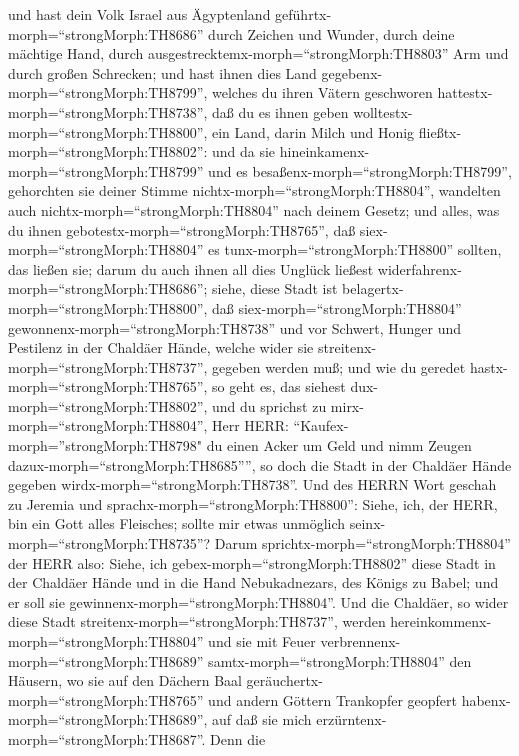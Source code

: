  und hast dein Volk Israel aus Ägyptenland
geführtx-morph=``strongMorph:TH8686'' durch Zeichen und Wunder, durch
deine mächtige Hand, durch ausgestrecktemx-morph=``strongMorph:TH8803''
Arm und durch großen Schrecken;  und hast ihnen dies Land
gegebenx-morph=``strongMorph:TH8799'', welches du ihren Vätern
geschworen hattestx-morph=``strongMorph:TH8738'', daß du es ihnen geben
wolltestx-morph=``strongMorph:TH8800'', ein Land, darin Milch und Honig
fließtx-morph=``strongMorph:TH8802'':  und da sie
hineinkamenx-morph=``strongMorph:TH8799'' und es
besaßenx-morph=``strongMorph:TH8799'', gehorchten sie deiner Stimme
nichtx-morph=``strongMorph:TH8804'', wandelten auch
nichtx-morph=``strongMorph:TH8804'' nach deinem Gesetz; und alles, was
du ihnen gebotestx-morph=``strongMorph:TH8765'', daß
siex-morph=``strongMorph:TH8804'' es tunx-morph=``strongMorph:TH8800''
sollten, das ließen sie; darum du auch ihnen all dies Unglück ließest
widerfahrenx-morph=``strongMorph:TH8686'';  siehe, diese
Stadt ist belagertx-morph=``strongMorph:TH8800'', daß
siex-morph=``strongMorph:TH8804'' gewonnenx-morph=``strongMorph:TH8738''
und vor Schwert, Hunger und Pestilenz in der Chaldäer Hände, welche
wider sie streitenx-morph=``strongMorph:TH8737'', gegeben werden muß;
und wie du geredet hastx-morph=``strongMorph:TH8765'', so geht es, das
siehest dux-morph=``strongMorph:TH8802'',  und du sprichst
zu mirx-morph=``strongMorph:TH8804'', Herr HERR:
``Kaufex-morph=''strongMorph:TH8798" du einen Acker um Geld und nimm
Zeugen dazux-morph=``strongMorph:TH8685'''', so doch die Stadt in der
Chaldäer Hände gegeben wirdx-morph=``strongMorph:TH8738''. 
Und des HERRN Wort geschah zu Jeremia und
sprachx-morph=``strongMorph:TH8800'':  Siehe, ich, der
HERR, bin ein Gott alles Fleisches; sollte mir etwas unmöglich
seinx-morph=``strongMorph:TH8735''?  Darum
sprichtx-morph=``strongMorph:TH8804'' der HERR also: Siehe, ich
gebex-morph=``strongMorph:TH8802'' diese Stadt in der Chaldäer Hände und
in die Hand Nebukadnezars, des Königs zu Babel; und er soll sie
gewinnenx-morph=``strongMorph:TH8804''.  Und die Chaldäer,
so wider diese Stadt streitenx-morph=``strongMorph:TH8737'', werden
hereinkommenx-morph=``strongMorph:TH8804'' und sie mit Feuer
verbrennenx-morph=``strongMorph:TH8689''
samtx-morph=``strongMorph:TH8804'' den Häusern, wo sie auf den Dächern
Baal geräuchertx-morph=``strongMorph:TH8765'' und andern Göttern
Trankopfer geopfert habenx-morph=``strongMorph:TH8689'', auf daß sie
mich erzürntenx-morph=``strongMorph:TH8687''.  Denn die
